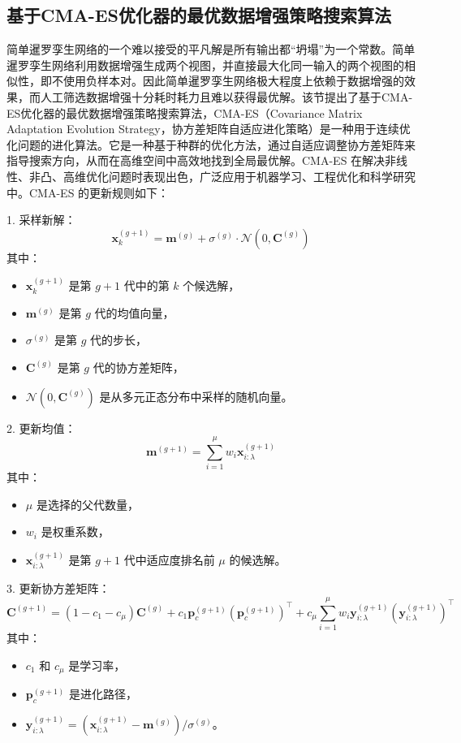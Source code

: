 \documentclass[master]{thesis-uestc}
\begin{document}
\subsection{基于CMA-ES优化器的最优数据增强策略搜索算法}
简单暹罗孪生网络的一个难以接受的平凡解是所有输出都“坍塌”为一个常数。简单暹罗孪生网络利用数据增强生成两个视图，并直接最大化同一输入的两个视图的相似性，即不使用负样本对。因此简单暹罗孪生网络极大程度上依赖于数据增强的效果，而人工筛选数据增强十分耗时耗力且难以获得最优解。该节提出了基于CMA-ES优化器的最优数据增强策略搜索算法，CMA-ES（Covariance Matrix Adaptation Evolution Strategy，协方差矩阵自适应进化策略）是一种用于连续优化问题的进化算法。它是一种基于种群的优化方法，通过自适应调整协方差矩阵来指导搜索方向，从而在高维空间中高效地找到全局最优解。CMA-ES 在解决非线性、非凸、高维优化问题时表现出色，广泛应用于机器学习、工程优化和科学研究中。CMA-ES 的更新规则如下：

1. 采样新解：
\begin{equation}
\mathbf{x}_k^{(g+1)} = \mathbf{m}^{(g)} + \sigma^{(g)} \cdot \mathcal{N}(0, \mathbf{C}^{(g)})
\label{eq:sample}
\end{equation}
其中：
\begin{itemize}
    \item \(\mathbf{x}_k^{(g+1)}\) 是第 \(g+1\) 代中的第 \(k\) 个候选解，
    \item \(\mathbf{m}^{(g)}\) 是第 \(g\) 代的均值向量，
    \item \(\sigma^{(g)}\) 是第 \(g\) 代的步长，
    \item \(\mathbf{C}^{(g)}\) 是第 \(g\) 代的协方差矩阵，
    \item \(\mathcal{N}(0, \mathbf{C}^{(g)})\) 是从多元正态分布中采样的随机向量。
\end{itemize}

2. 更新均值：
\begin{equation}
\mathbf{m}^{(g+1)} = \sum_{i=1}^{\mu} w_i \mathbf{x}_{i:\lambda}^{(g+1)}
\label{eq:mean_update}
\end{equation}
其中：
\begin{itemize}
    \item \(\mu\) 是选择的父代数量，
    \item \(w_i\) 是权重系数，
    \item \(\mathbf{x}_{i:\lambda}^{(g+1)}\) 是第 \(g+1\) 代中适应度排名前 \(\mu\) 的候选解。
\end{itemize}

3. 更新协方差矩阵：
\begin{equation}
\mathbf{C}^{(g+1)} = (1 - c_1 - c_\mu) \mathbf{C}^{(g)} + c_1 \mathbf{p}_c^{(g+1)} (\mathbf{p}_c^{(g+1)})^\top + c_\mu \sum_{i=1}^{\mu} w_i \mathbf{y}_{i:\lambda}^{(g+1)} (\mathbf{y}_{i:\lambda}^{(g+1)})^\top
\label{eq:covariance_update}
\end{equation}
其中：
\begin{itemize}
    \item \(c_1\) 和 \(c_\mu\) 是学习率，
    \item \(\mathbf{p}_c^{(g+1)}\) 是进化路径，
    \item \(\mathbf{y}_{i:\lambda}^{(g+1)} = (\mathbf{x}_{i:\lambda}^{(g+1)} - \mathbf{m}^{(g)}) / \sigma^{(g)}\)。
\end{itemize}
\end{document}
